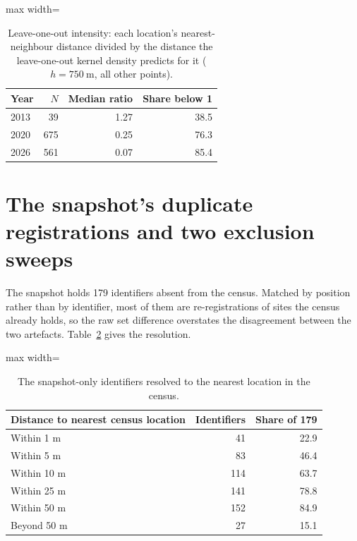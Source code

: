 \documentclass[fleqn,10pt]{wlpeerj}
\begin{document}
\begin{table}[H]
\centering
\caption{Leave-one-out intensity: each location's nearest-neighbour distance divided by the distance the leave-one-out kernel density predicts for it ($h = \SI{750}{\meter}$, all other points).}
\label{si:loo}
\small
\begin{adjustbox}{max width=\linewidth}
\begin{tabular}{lrrr}
\toprule
Year & $N$ & Median ratio & Share below 1 \\
\midrule
2013 & 39 & 1.27 & 38.5 \\
2020 & 675 & 0.25 & 76.3 \\
2026 & 561 & 0.07 & 85.4 \\
\bottomrule
\end{tabular}
\end{adjustbox}
\end{table}

\section{The snapshot's duplicate registrations and two exclusion sweeps}
\label{si:dup}

The snapshot holds 179 identifiers absent from the census. Matched by position rather
than by identifier, most of them are re-registrations of sites the census already holds, so the
raw set difference overstates the disagreement between the two artefacts. Table~\ref{si:snapdist}
gives the resolution.

\begin{table}[H]
\centering
\caption{The snapshot-only identifiers resolved to the nearest location in the census.}
\label{si:snapdist}
\small
\begin{adjustbox}{max width=\linewidth}
\begin{tabular}{lrr}
\toprule
Distance to nearest census location & Identifiers & Share of 179 \\
\midrule
Within 1 m & 41 & 22.9 \\
Within 5 m & 83 & 46.4 \\
Within 10 m & 114 & 63.7 \\
Within 25 m & 141 & 78.8 \\
Within 50 m & 152 & 84.9 \\
Beyond 50 m & 27 & 15.1 \\
\bottomrule
\end{tabular}
\end{adjustbox}
\end{table}
\end{document}
